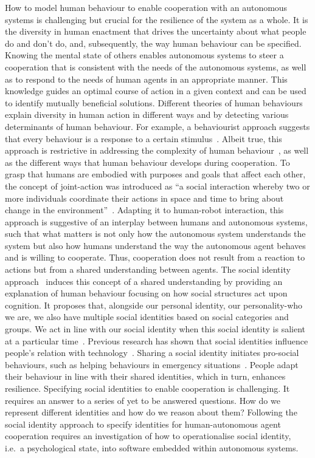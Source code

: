\documentclass[sigconf]{acmart}
\begin{document}
How to model human behaviour to enable cooperation with an autonomous systems is challenging but crucial for the resilience of the system as a whole. It is the diversity in human enactment that drives the uncertainty about what people do and don’t do, and, subsequently, the way human behaviour can be specified. Knowing the mental state of others enables autonomous systems to steer a cooperation that is consistent with the needs of the autonomous systems, as well as to respond to the needs of human agents in an appropriate manner. This knowledge guides an optimal course of action in a given context and can be used to identify mutually beneficial solutions. 
Different theories of human behaviours explain diversity in human action in different ways and by detecting various determinants of human behaviour. For example, a behaviourist approach suggests that every behaviour is a response to a certain stimulus~\cite{heimlich2008understanding}. Albeit true, this approach is restrictive in addressing the complexity of human behaviour~\cite{taylor2021explanation}, as well as the different ways that human behaviour develops during cooperation. To grasp that humans are embodied with purposes and goals that affect each other, the concept of joint-action was introduced as ``a social interaction whereby two or more individuals coordinate their actions in space and time to bring about change in the environment''~\cite{sebanz2006joint}. Adapting it to human-robot interaction, this approach is suggestive of an interplay between humans and autonomous systems, such that what matters is not only how the autonomous system understands the system but also how humans understand the way the autonomous agent behaves and is willing to cooperate. Thus, cooperation does not result from a reaction to actions but from a shared understanding between agents. 
The social identity approach~\cite{spears2021social} induces this concept of a shared understanding by providing an explanation of human behaviour focusing on how social structures act upon cognition. It proposes that, alongside our personal identity, our personality-who we are, we also have multiple social identities based on social categories and groups. We act in line with our social identity when this social identity is salient at a particular time~\cite{tajfel1982social}. Previous research has shown that social identities influence people’s relation with technology~\cite{lee2001effect}. Sharing a social identity initiates pro-social behaviours, such as helping behaviours in emergency situations~\cite{drury2018role}. People adapt their behaviour in line with their shared identities, which in turn, enhances resilience. Specifying social identities to enable cooperation is challenging. It requires an answer to a series of yet to be answered questions. How do we represent different identities and how do we reason about them? Following the social identity approach to specify identities for human-autonomous agent cooperation requires an investigation of how to operationalise social identity, i.e.~a psychological state, into software embedded within autonomous systems.
\end{document}
